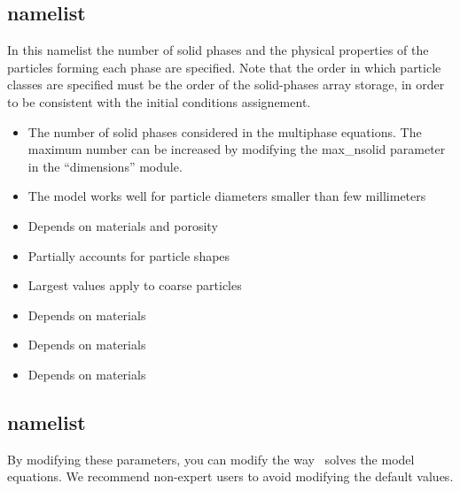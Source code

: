 \subsection{ namelist}
In this namelist the number of solid phases and the physical properties of the
particles forming each phase are specified. Note that the order in which 
particle classes are specified must be the order of the solid-phases array 
storage, in order to be consistent with the initial conditions assignement.

\begin{itemize}

\item
{}
{The number of solid phases considered in the multiphase equations.
The maximum number can be increased by modifying the max\_nsolid parameter
in the ``dimensions'' module.}

\item
{}
{The model works well for particle diameters smaller than few millimeters}

\item
{}
{Depends on materials and porosity}

\item
{}
{Partially accounts for particle shapes}

\item
{}
{Largest values apply to coarse particles}

\item
{}
{Depends on materials}

\item
{}
{Depends on materials}

\item
{}
{Depends on materials}

\end{itemize}

\subsection{ namelist}
By modifying these parameters, you can modify the way \PDAC\ solves the 
model equations. We recommend non-expert users to avoid modifying the
default values.

